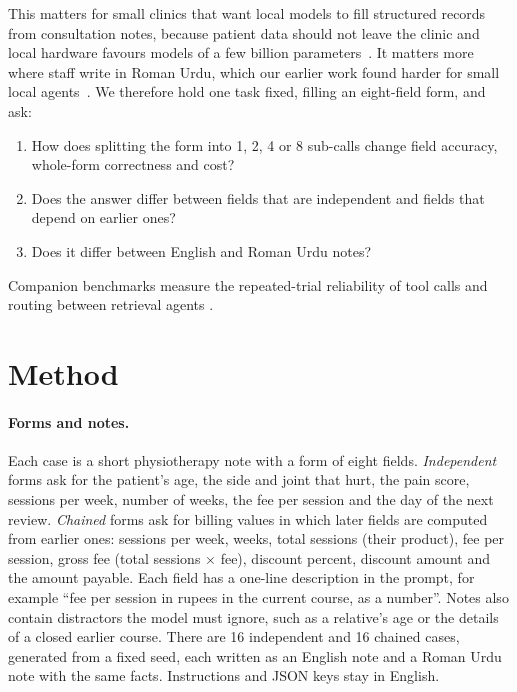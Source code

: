 \documentclass[11pt,a4paper]{article}
\begin{document}
This matters for small clinics that want local models to fill structured records from consultation notes, because
patient data should not leave the clinic and local hardware favours models of a few billion
parameters~\cite{qwen2025qwen25,grattafiori2024llama3}. It matters more where staff write in Roman Urdu, which our
earlier work found harder for small local agents~\cite{hussain2026romanurdu}. We therefore hold one task fixed, filling
an eight-field form, and ask:

\begin{enumerate}
  \item How does splitting the form into 1, 2, 4 or 8 sub-calls change field accuracy, whole-form correctness and
  cost?
  \item Does the answer differ between fields that are independent and fields that depend on earlier ones?
  \item Does it differ between English and Roman Urdu notes?
\end{enumerate}

Companion benchmarks measure the repeated-trial reliability of tool calls \cite{hussain2026toolcall} and routing between retrieval agents \cite{hussain2026router}.

\section{Method}

\paragraph{Forms and notes.} Each case is a short physiotherapy note with a form of eight fields. \emph{Independent}
forms ask for the patient's age, the side and joint that hurt, the pain score, sessions per week, number of weeks, the
fee per session and the day of the next review. \emph{Chained} forms ask for billing values in which later fields are
computed from earlier ones: sessions per week, weeks, total sessions (their product), fee per session, gross fee
(total sessions $\times$ fee), discount percent, discount amount and the amount payable. Each field has a one-line
description in the prompt, for example ``fee per session in rupees in the current course, as a number''. Notes also
contain distractors the model must ignore, such as a relative's age or the details of a closed earlier course. There
are 16 independent and 16 chained cases, generated from a fixed seed, each written as an English note and a Roman Urdu
note with the same facts. Instructions and JSON keys stay in English.
\end{document}
